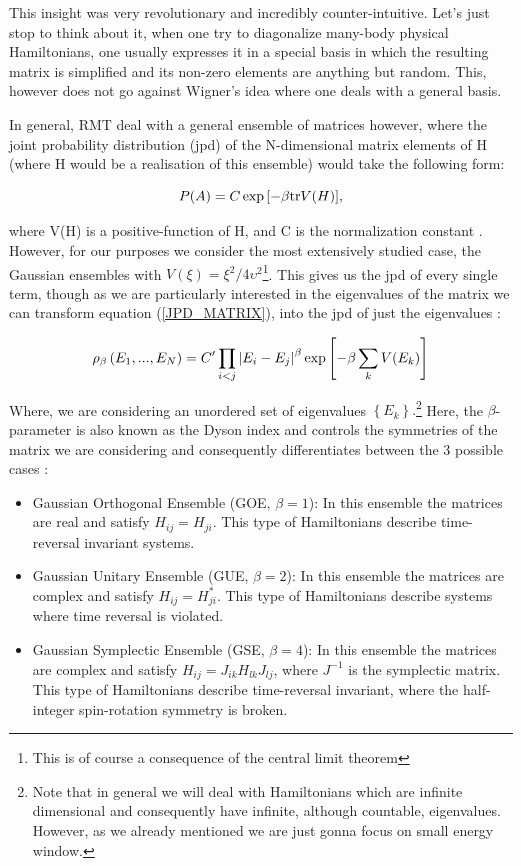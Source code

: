 \documentclass[11pt,a4paper]{article}
\begin{document}
This insight was very revolutionary and incredibly counter-intuitive. Let's just stop to think about it, when one try to diagonalize many-body physical Hamiltonians, one usually expresses it in a special basis in which the resulting matrix is simplified and its non-zero elements are anything but random. This, however does not go against Wigner's idea where one deals with a general basis.

In general, RMT deal with a general ensemble of matrices however, where the joint probability distribution (jpd) of the N-dimensional matrix elements of H (where H would be a realisation of this ensemble) would take the following form:

\begin{equation}\LA{JPD_MATRIX}
    P(A) = C\exp{\left[-\beta\text{tr}V(H)\right]},
\end{equation}

where V(H) is a positive-function of H, and C is the normalization constant \cite{pandey_quantum_2019}. However, for our purposes we consider the most extensively studied case, the Gaussian ensembles with $V(\xi)=\xi^2/4\upsilon^2$\footnote{This is of course a consequence of the central limit theorem}. This gives us the jpd of every single term, though as we are particularly interested in the eigenvalues of the matrix we can transform equation (\ref{JPD_MATRIX}), into the jpd of just the eigenvalues \cite{pandey_quantum_2019,martinez-azcona_decomposing_2025}:

\begin{equation}\LA{JPD_EIGEN}
    \rho_\beta\left(E_1,...,E_N\right) = C'\prod_{i<j}\left|E_i-E_j\right|^\beta \exp{\left[-\beta \sum_k V(E_k)\right]}
\end{equation}

Where, we are considering an unordered set of eigenvalues $\left\{E_k\right\}.$\footnote{Note that in general we will deal with Hamiltonians which are infinite dimensional and consequently have infinite, although countable, eigenvalues. However, as we already mentioned we are just gonna focus on small energy window.} Here, the $\beta$-parameter is also known as the Dyson index and controls the symmetries of the matrix we are considering and consequently differentiates between the 3 possible cases \cite{pandey_quantum_2019,dalessio_quantum_2016}:

\begin{itemize}
    \item Gaussian Orthogonal Ensemble (GOE, $\beta = 1$): In this ensemble the matrices are real and satisfy $H_{ij}=H_{ji}$. This type of Hamiltonians describe time-reversal invariant systems.
    \item Gaussian Unitary Ensemble (GUE, $\beta = 2$): In this ensemble the matrices are complex and satisfy $H_{ij}=H_{ji}^*$. This type of Hamiltonians describe systems where time reversal is violated.
    \item Gaussian Symplectic Ensemble (GSE, $\beta = 4$): In this ensemble the matrices are complex and satisfy $H_{ij}=J_{ik}H_{lk}J_{lj}$, where $J^{-1}$ is the symplectic matrix. This type of Hamiltonians describe time-reversal invariant, where the half-integer spin-rotation symmetry is broken.
\end{itemize}
\end{document}
